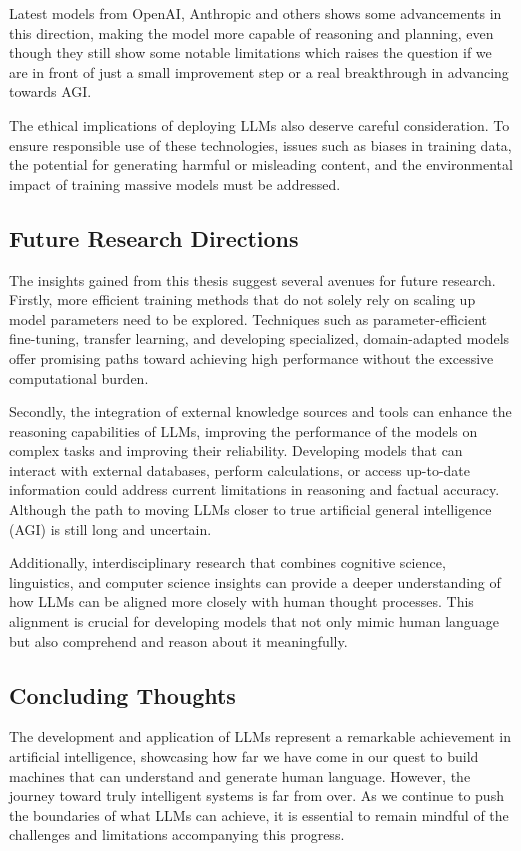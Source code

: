 Latest models from OpenAI, Anthropic and others shows some advancements in this direction, making the model more capable of reasoning and planning, even though they still show some notable limitations which raises the question if we are in front of just a small improvement step or a real breakthrough in advancing towards AGI\@.

The ethical implications of deploying LLMs also deserve careful consideration.
To ensure responsible use of these technologies, issues such as biases in training data, the potential for generating harmful or misleading content, and the environmental impact of training massive models must be addressed.

\subsection*{Future Research Directions}
The insights gained from this thesis suggest several avenues for future research.
Firstly, more efficient training methods that do not solely rely on scaling up model parameters need to be explored.
Techniques such as parameter-efficient fine-tuning, transfer learning, and developing specialized, domain-adapted models offer promising paths toward achieving high performance without the excessive computational burden.

Secondly, the integration of external knowledge sources and tools can enhance the reasoning capabilities of LLMs, improving the performance of the models on complex tasks and improving their reliability.
Developing models that can interact with external databases, perform calculations, or access up-to-date information could address current limitations in reasoning and factual accuracy.
Although the path to moving LLMs closer to true artificial general intelligence (AGI) is still long and uncertain.

Additionally, interdisciplinary research that combines cognitive science, linguistics, and computer science insights can provide a deeper understanding of how LLMs can be aligned more closely with human thought processes.
This alignment is crucial for developing models that not only mimic human language but also comprehend and reason about it meaningfully.

\subsection*{Concluding Thoughts}
The development and application of LLMs represent a remarkable achievement in artificial intelligence, showcasing how far we have come in our quest to build machines that can understand and generate human language.
However, the journey toward truly intelligent systems is far from over.
As we continue to push the boundaries of what LLMs can achieve, it is essential to remain mindful of the challenges and limitations accompanying this progress.

